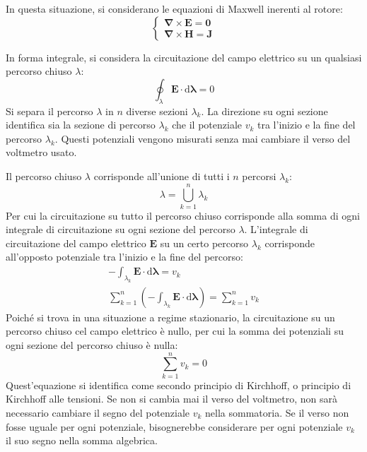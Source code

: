 \documentclass{article}
\newcommand{\vect}[1]{\boldsymbol{\mathbf{#1}}}
\newcommand{\df}{\mathrm{d}}
\numberwithin{equation}{subsection}
\begin{document}
In questa situazione, si considerano le equazioni di Maxwell inerenti al rotore:
\begin{equation*}
    \begin{cases}
        \vect\nabla\times\vect{E}=\vect0\\
        \vect\nabla\times\vect{H}=\vect{J}
    \end{cases}
\end{equation*}


In forma integrale, si considera la circuitazione del campo elettrico su un qualsiasi percorso chiuso $\lambda$:
\begin{equation*}
    \displaystyle\oint_{\lambda}\vect{E}\cdot \df\vect{\lambda}=0
\end{equation*}
Si separa il percorso $\lambda$ in $n$ diverse sezioni $\lambda_k$. La direzione su ogni sezione identifica sia la sezione di percorso $\lambda_k$ che il potenziale $v_k$ tra 
l'inizio e la fine del percorso $\lambda_k$. Questi potenziali vengono misurati senza mai cambiare il verso del voltmetro usato. 

Il percorso chiuso $\lambda$ corrisponde all'unione di tutti i $n$ percorsi $\lambda_k$:
\begin{equation*}
    \lambda=\bigcup_{k=1}^n\lambda_k
\end{equation*}
Per cui la circuitazione su tutto il percorso chiuso corrisponde alla somma di ogni integrale di circuitazione su ogni sezione del percorso $\lambda$. L'integrale di circuitazione 
del campo elettrico $\vect{E}$ su un certo percorso $\lambda_k$ corrisponde all'opposto potenziale tra l'inizio e la fine del percorso:
\begin{gather*}
    -\int_{\lambda_k}\vect{E}\cdot \df\vect{\lambda}=v_k\\
    \displaystyle\sum_{k=1}^n\left(-\int_{\lambda_k}\vect{E}\cdot \df\vect{\lambda}\right)=\sum_{k=1}^nv_k
\end{gather*}
Poiché si trova in una situazione a regime stazionario, la circuitazione su un percorso chiuso cel campo elettrico è nullo, per cui la somma dei potenziali su ogni sezione 
del percorso chiuso è nulla:
\begin{equation}
    \displaystyle\sum_{k=1}^nv_k=0
\end{equation}
Quest'equazione si identifica come secondo principio di Kirchhoff, o principio di Kirchhoff alle tensioni. 
Se non si cambia mai il verso del voltmetro, non sarà necessario cambiare il segno del potenziale $v_k$ nella sommatoria. Se il verso non fosse uguale per ogni potenziale, 
bisognerebbe considerare per ogni potenziale $v_k$ il suo segno nella somma algebrica. 
\end{document}
